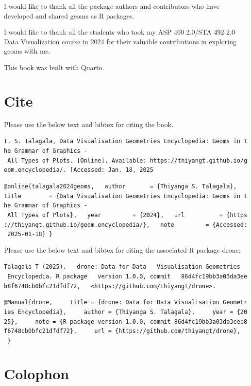 \documentclass[
  letterpaper,
  DIV=11,
  numbers=noendperiod]{scrreprt}
\begin{document}

I would like to thank all the package authors and contributors who have
developed and shared geoms as R packages.

I would like to thank all the students who took my ASP 460 2.0/STA 492
2.0 Data Visualization course in 2024 for their valuable contributions
in exploring geoms with me.

This book was built with Quarto.

\section*{Cite}\label{cite}


Please use the below text and bibtex for citing the book.

\texttt{T.\ S.\ Talagala,\ Data\ Visualisation\ Geometries\ Encyclopedia:\ Geoms\ in\ the\ Grammar\ of\ Graphics\ -\ All\ Types\ of\ Plots.\ {[}Online{]}.\ Available:\ https://thiyangt.github.io/geom.encyclopedia/.\ {[}Accessed:\ Jan.\ 18,\ 2025}

\texttt{@online\{talagala2024geoms,\ \ \ author\ \ \ \ \ \ \ =\ \{Thiyanga\ S.\ Talagala\},\ \ \ title\ \ \ \ \ \ \ \ =\ \{Data\ Visualisation\ Geometries\ Encyclopedia:\ Geoms\ in\ the\ Grammar\ of\ Graphics\ -\ All\ Types\ of\ Plots\},\ \ \ year\ \ \ \ \ \ \ \ \ =\ \{2024\},\ \ \ url\ \ \ \ \ \ \ \ \ \ =\ \{https://thiyangt.github.io/geom.encyclopedia/\},\ \ \ note\ \ \ \ \ \ \ \ \ =\ \{Accessed:\ 2025-01-18\}\ \}}

Please use the below text and bibtex for citing the associated R package
drone.

\texttt{Talagala\ T\ (2025).\ \ \ drone:\ Data\ for\ Data\ \ \ Visualisation\ Geometries\ \ \ Encyclopedia.\ R\ package\ \ \ version\ 1.0.0,\ commit\ \ \ 86d4fc19bb3a03da3eeb8f6748cb0bfc21dfdf72,\ \ \ \textless{}https://github.com/thiyangt/drone\textgreater{}.}

\texttt{@Manual\{drone,\ \ \ \ \ title\ =\ \{drone:\ Data\ for\ Data\ Visualisation\ Geometries\ Encyclopedia\},\ \ \ \ \ author\ =\ \{Thiyanga\ S.\ Talagala\},\ \ \ \ \ year\ =\ \{2025\},\ \ \ \ \ note\ =\ \{R\ package\ version\ 1.0.0,\ commit\ 86d4fc19bb3a03da3eeb8f6748cb0bfc21dfdf72\},\ \ \ \ \ url\ =\ \{https://github.com/thiyangt/drone\},\ \ \ \}}

\section*{Colophon}\label{colophon}
\end{document}
